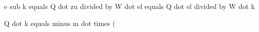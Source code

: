 e sub k equals Q dot zu divided by W dot el equals Q dot el divided by W dot k

Q dot k equals minus m dot times (